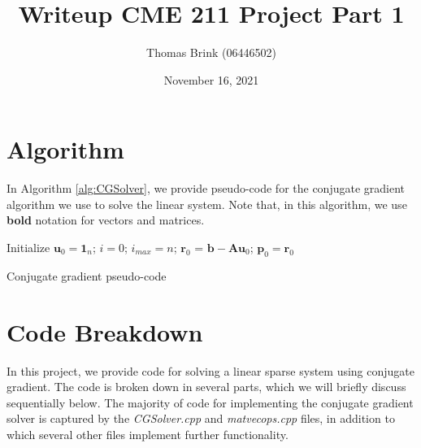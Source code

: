 \documentclass[12pt, a4paper]{article}
\title{\textbf{Writeup CME 211 Project Part 1}}
\author{Thomas Brink (06446502)}
\date{November 16, 2021}
\begin{document}
\maketitle

\section{Algorithm}
In Algorithm \ref{alg:CGSolver}, we provide pseudo-code for
the conjugate gradient algorithm we use to solve the linear
system. Note that, in this algorithm, we use \textbf{bold}
notation for vectors and matrices.

\begin{algorithm}[h]
    \setcounter{AlgoLine}{0}
    
    
    Initialize $\mathbf{u}_0 = \mathbf{1}_n$; $i = 0$;
    $i_{max} = n$; $\mathbf{r}_0$ = $\mathbf{b} - 
    \mathbf{A}\mathbf{u}_0$; $\mathbf{p}_0 = \mathbf{r}_0$
    
    
    \caption{Conjugate gradient pseudo-code}
    \label{alg:CGSolver}
    \end{algorithm}

\newpage
\section{Code Breakdown}
In this project, we provide code for solving a linear sparse system
using conjugate gradient. The code is broken down in several parts,
which we will briefly discuss sequentially below. The majority of code
for implementing the conjugate gradient solver is captured by the
\textit{CGSolver.cpp} and \textit{matvecops.cpp} files, in addition
to which several other files implement further functionality.
\end{document}
